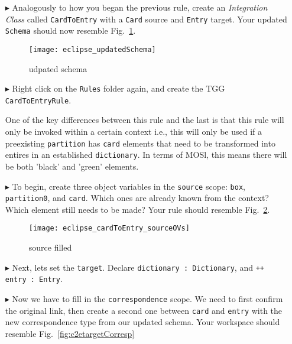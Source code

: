 \begin{itemize} 

\item[$\blacktriangleright$] Analogously to how you began the previous rule, create an \emph{Integration Class} called \texttt{CardToEntry} with a \texttt{Card}
source and \texttt{Entry} target. Your updated \texttt{Schema} should now resemble Fig.~\ref{fig:updatedSchema}.

\begin{figure}[htbp]
\begin{center}
  \texttt{[image: eclipse\_updatedSchema]}
  \caption{udpated schema}
  \label{fig:updatedSchema}
\end{center}
\end{figure}

\item[$\blacktriangleright$] Right click on the \texttt{Rules} folder again, and create the TGG \texttt{CardToEntryRule}.

One of the key differences between this rule and the last is that this rule will only be invoked within a certain context i.e.,
this will only be used if a preexisting \texttt{partition} has \texttt{card} elements that need to be transformed into entires in an established
\texttt{dictionary}. In terms of MOSl, this means there will be both 'black' and 'green' elements.

\item[$\blacktriangleright$] To begin, create three object variables in the \texttt{source} scope: \texttt{box}, \texttt{partition0}, and \texttt{card}. Which
ones are already known from the context? Which element still needs to be made? Your rule should resemble Fig.~\ref{fig:c2eRuleSource}.

\begin{figure}[htbp]
\begin{center}
  \texttt{[image: eclipse\_cardToEntry\_sourceOVs]}
  \caption{source filled}
  \label{fig:c2eRuleSource}
\end{center}
\end{figure}

\item[$\blacktriangleright$] Next, lets set the \texttt{target}. Declare \texttt{dictionary : Dictionary}, and \texttt{++ entry : Entry}.

\item[$\blacktriangleright$] Now we have to fill in the \texttt{correspondence} scope. We need to first confirm the original link, then create a second one
between \texttt{card} and \texttt{entry} with the new correspondence type from our updated schema. Your workspace should resemble Fig.~\ref{fig:c2etargetCorresp}


\end{itemize}
